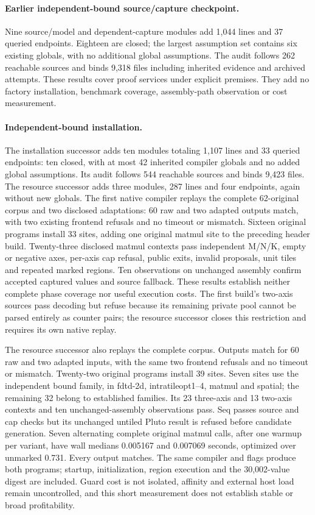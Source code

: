 \paragraph{Earlier independent-bound source/capture checkpoint.}
Nine source/model and dependent-capture modules add 1,044 lines and 37 queried
endpoints. Eighteen are closed; the largest assumption set contains six existing
globals, with no additional global assumptions. The audit follows 262 reachable
sources and binds 9,318 files including inherited evidence and archived attempts.
These results cover proof services under explicit premises. They add no factory
installation, benchmark coverage, assembly-path observation or cost measurement.

\paragraph{Independent-bound installation.}
The installation successor adds ten modules totaling 1,107 lines and 33 queried
endpoints: ten closed, with at most 42 inherited compiler globals and no added
global assumptions. Its audit follows 544 reachable sources and binds 9,423
files. The resource successor adds three modules, 287 lines and four endpoints,
again without new globals. The first native compiler replays the complete
62-original corpus and two disclosed adaptations: 60 raw and two adapted outputs
match, with two existing frontend refusals and no timeout or mismatch. Sixteen
original programs install 33 sites, adding one original matmul site to the
preceding header build. Twenty-three disclosed matmul contexts pass independent
M/N/K, empty or negative axes, per-axis cap refusal, public exits, invalid
proposals, unit tiles and repeated marked regions. Ten observations on unchanged
assembly confirm accepted captured values and source fallback. These results
establish neither complete phase coverage nor useful execution costs. The first
build's two-axis sources pass decoding but refuse because its remaining private
pool cannot be parsed entirely as counter pairs; the resource successor closes
this restriction and requires its own native replay.

The resource successor also replays the complete corpus.
Outputs match for 60 raw and two adapted inputs, with the same two frontend
refusals and no timeout or mismatch.
Twenty-two original programs install 39 sites. Seven sites use the independent
bound family, in fdtd-2d, intratileopt1--4, matmul and spatial; the remaining 32
belong to established families. Its 23 three-axis and 13 two-axis contexts and
ten unchanged-assembly observations pass. Seq passes source and cap checks but
its unchanged untiled Pluto result is refused before candidate generation.
Seven alternating complete original matmul calls, after one warmup per variant,
have wall medians 0.005167 and 0.007069 seconds, optimized over unmarked 0.731.
Every output matches. The same compiler and flags produce both programs; startup,
initialization, region execution and the 30,002-value digest are included.
Guard cost is not isolated, affinity and external host load remain uncontrolled,
and this short measurement does not establish stable or broad profitability.
